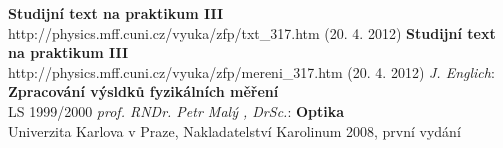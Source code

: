 \documentclass[a4paper,12pt]{article}
\begin{document}
\begin{thebibliography}{5}
	 \textbf{Studijní text na praktikum III} \\http://physics.mff.cuni.cz/vyuka/zfp/txt\_317.htm (20. 4. 2012)
	 \textbf{Studijní text na praktikum III} \\http://physics.mff.cuni.cz/vyuka/zfp/mereni\_317.htm (20. 4. 2012)
     \emph{J. Englich}: \textbf{Zpracování výsldků fyzikálních měření} \\ LS 1999/2000
     \emph{prof. RNDr. Petr Malý , DrSc.}: \textbf{Optika}\\Univerzita Karlova v Praze, Nakladatelství Karolinum 2008, první vydání
\end{thebibliography}
\end{document}
